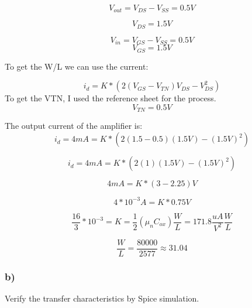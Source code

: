 \documentclass[10pt,a4paper]{article}
\begin{document}
\begin{equation}
V_{out} = V_{DS} - V_{SS}  = 0.5 V
\end{equation}

\begin{equation}
V_{DS} = 1.5 V
\end{equation}

\begin{equation}
V_{in} = V_{GS} - V_{SS} = 0.5 V
\end{equation}
\begin{equation}
V_{GS} = 1.5 V
\end{equation}

To get the W/L we can use the current:

\begin{equation}
i_{d} = K * (2(V_{GS} - V_{TN}) V_{DS} - V_{DS}^2)	
\end{equation}
To get the VTN, I used the reference sheet for the process. 
\begin{equation}
V_{TN} =  0.5V
\end{equation}


The output current of the amplifier is:
\begin{equation}
i_{d} = 4mA = K * (2(1.5 -0.5)(1.5V) - (1.5V)^2)
\end{equation}

\begin{equation}
i_{d} = 4mA = K * (2(1)(1.5V) - (1.5V)^2)
\end{equation}

\begin{equation}
4mA = K * (3 - 2.25)V
\end{equation}

\begin{equation}
4*10^{-3} A = K * 0.75V
\end{equation}

\begin{equation}
\frac{16}{3}*10^{-3} = K = \frac{1}{2}(\mu_n C_{ox})\frac{W}{L} = 171.8 \frac{uA}{V^2} \frac{W}{L}
\end{equation}

\begin{equation}
\frac{W}{L} = \frac{80000}{2577} \approx 31.04
\end{equation}



\subsubsection*{b)}
Verify the transfer characteristics by Spice simulation.
\end{document}
